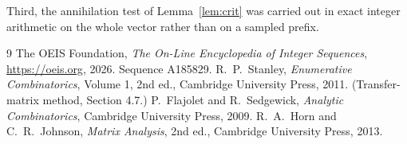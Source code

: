 \documentclass[11pt,a4paper]{article}
\theoremstyle{plain}
\theoremstyle{definition}
\begin{document}
Third, the annihilation test of Lemma~\ref{lem:crit} was carried out in exact integer
arithmetic on the whole vector rather than on a sampled prefix.

\begin{thebibliography}{9}
 The OEIS Foundation, \emph{The On-Line Encyclopedia of Integer
Sequences}, \url{https://oeis.org}, 2026. Sequence A185829.
 R.~P.~Stanley, \emph{Enumerative Combinatorics}, Volume 1, 2nd ed.,
Cambridge University Press, 2011. (Transfer-matrix method, Section 4.7.)
 P.~Flajolet and R.~Sedgewick, \emph{Analytic Combinatorics}, Cambridge
University Press, 2009.
 R.~A.~Horn and C.~R.~Johnson, \emph{Matrix Analysis}, 2nd ed., Cambridge
University Press, 2013.
\end{thebibliography}
\end{document}
